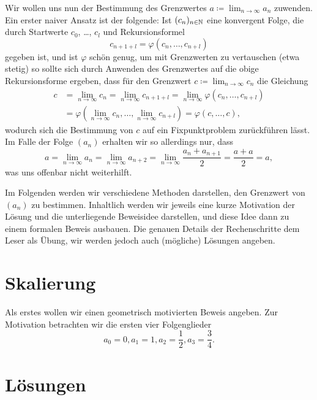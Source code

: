 \documentclass[a4paper,10pt]{article}
\begin{document}
Wir wollen uns nun der Bestimmung des Grenzwertes $a \coloneqq \lim_{n \to \infty} a_n$ zuwenden. Ein erster naiver Ansatz ist der folgende: Ist $(c_n)_{n \in \mathbb{N}}$ eine konvergent Folge, die durch Startwerte $c_0$, \dots, $c_l$ und Rekursionsformel
\[
 c_{n+1+l} = \varphi(c_n, \dotsc, c_{n+l})
\]
gegeben ist, und ist $\varphi$ schön genug, um mit Grenzwerten zu vertauschen (etwa stetig) so sollte sich durch Anwenden des Grenzwertes auf die obige Rekursionsforme ergeben, dass für den Grenzwert $c \coloneqq \lim_{n \to \infty} c_n$ die Gleichung
\begin{align*}
 c
 &= \lim_{n \to \infty} c_n
 = \lim_{n \to \infty} c_{n+1+l}
 = \lim_{n \to \infty} \varphi(c_n, \dotsc, c_{n+l}) \\
 &= \varphi\left(\lim_{n \to \infty} c_n, \dotsc, \lim_{n \to \infty} c_{n+l}\right)
 = \varphi(c, \dotsc, c),
\end{align*}
wodurch sich die Bestimmung von $c$ auf ein Fixpunktproblem zurückführen lässt. Im Falle der Folge $(a_n)$ erhalten wir so allerdings nur, dass
\[
 a
 = \lim_{n \to \infty} a_n
 = \lim_{n \to \infty} a_{n+2}
 = \lim_{n \to \infty} \frac{a_n + a_{n+1}}{2}
 = \frac{a + a}{2}
 = a,
\]
was uns offenbar nicht weiterhilft.


Im Folgenden werden wir verschiedene Methoden darstellen, den Grenzwert von $(a_n)$ zu bestimmen. Inhaltlich werden wir jeweils eine kurze Motivation der Lösung und die unterliegende Beweisidee darstellen, und diese Idee dann zu einem formalen Beweis ausbauen. Die genauen Details der Rechenschritte dem Leser als Übung, wir werden jedoch auch (mögliche) Lösungen angeben.





\section{Skalierung}
Als erstes wollen wir einen geometrisch motivierten Beweis angeben. Zur Motivation betrachten wir die ersten vier Folgenglieder
\[
 a_0 = 0, a_1 = 1, a_2 = \frac{1}{2}, a_3 = \frac{3}{4}.
\]








\section{Lösungen}
\end{document}

